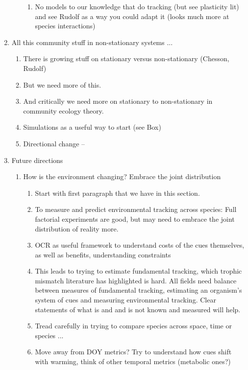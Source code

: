 \documentclass[11pt,letterpaper]{article}
\begin{document}
\begin{enumerate}
\begin{enumerate}
\begin{enumerate}
\item No models to our knowledge that do tracking (but see plasticity lit) and see Rudolf as a way you could adapt it (looks much more at species interactions)
\end{enumerate}
\end{enumerate}
\item All this community stuff in non-stationary systems ... 
\begin{enumerate}
\item There is growing stuff on stationary versus non-stationary (Chesson, Rudolf)
\item But we need more of this. 
\item And critically we need more on stationary to non-stationary in community ecology theory. 
\item Simulations as a useful way to start (see Box)
\item Directional change -- 
\end{enumerate}
\item Future directions
\begin{enumerate}
\item How is the environment changing? Embrace the joint distribution 
\begin{enumerate}
\item Start with first paragraph that we have in this section.
\item To measure and predict environmental tracking across species: Full factorial experiments are good, but may need to embrace the joint distribution of reality more.
\item OCR as useful framework to understand costs of the cues themselves, as well as benefits, understanding constraints
\item This leads to trying to estimate fundamental tracking, which trophic mismatch literature has highlighted is hard. All fields need balance between measures of fundamental tracking, estimating an organism's system of cues and measuring environmental tracking. Clear statements of what is and and is not known and measured will help. 
\item Tread carefully in trying to compare species across space, time or species ... 
\item Move away from DOY metrics? Try to understand how cues shift with warming, think of other temporal metrics (metabolic ones?)

\end{enumerate}
\end{enumerate}
\end{enumerate}
\end{document}
